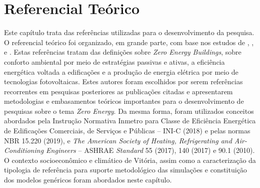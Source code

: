 \section{Referencial Teórico}
\begin{onehalfspace}
    Este capítulo trata das referências utilizadas para o desenvolvimento da 
    pesquisa. O referencial teórico foi organizado, em grande parte, com base 
    nos estudos de \textcite{Didone2014}, \textcite{Didone2014a}, 
    \textcite{Kurnitski2011a}  e \textcite{Torcellini2006}.  Estas  referências  tratam  
    das definições sobre \textit{Zero Energy Buildings}, sobre conforto ambiental por 
    meio de estratégias passivas e ativas, a eficiência energética voltada a 
    edificações e a produção de energia elétrica por meio de tecnologias 
    fotovoltaicas. Estes autores foram escolhidos por serem referências 
    recorrentes em pesquisas posteriores as publicações citadas e apresentarem 
    metodologias e embasamentos teóricos importantes para o desenvolvimento de 
    pesquisas sobre o tema \textit{Zero Energy}. Da mesma forma, foram utilizados 
    conceitos abordados pela Instrução Normativa Inmetro para Classe de 
    Eficiência Energética de Edificações Comerciais, de Serviços e Públicas 
    – INI-C (2018) e pelas  normas  NBR  15.220  (2019),  e \textit{The American 
    Society of Heating, Refrigerating and Air-Conditioning 
    Engineers} – ASHRAE \textit{Standard} 55 (2017), 140 (2017) e 90.1 (2010). 
    O contexto socioeconômico e climático de Vitória, assim como a caracterização 
    da tipologia de referência  para  suporte  metodológico  das  simulações  
    e  constituição  dos  modelos  genéricos foram abordados neste capítulo.





\end{onehalfspace}
